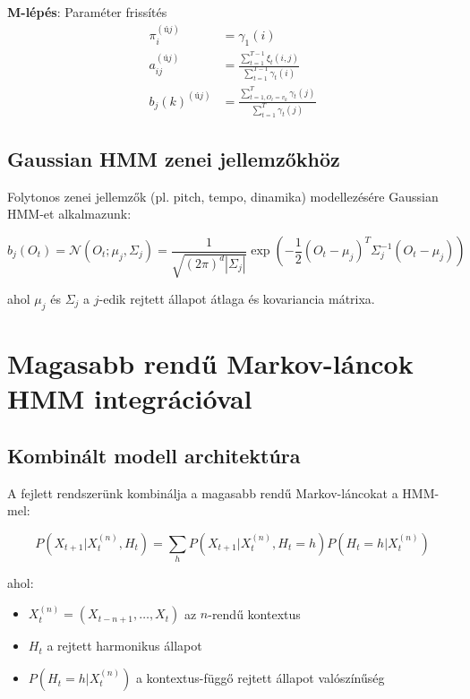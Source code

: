 \textbf{M-lépés}: Paraméter frissítés
\begin{align}
\pi_i^{(új)} &= \gamma_1(i) \\
a_{ij}^{(új)} &= \frac{\sum_{t=1}^{T-1} \xi_t(i,j)}{\sum_{t=1}^{T-1} \gamma_t(i)} \\
b_j(k)^{(új)} &= \frac{\sum_{t=1, O_t=v_k}^{T} \gamma_t(j)}{\sum_{t=1}^{T} \gamma_t(j)}
\end{align}

\subsection{Gaussian HMM zenei jellemzőkhöz}

Folytonos zenei jellemzők (pl. pitch, tempo, dinamika) modellezésére Gaussian HMM-et alkalmazunk:

\begin{equation}
b_j(O_t) = \mathcal{N}(O_t; \mu_j, \Sigma_j) = \frac{1}{\sqrt{(2\pi)^d |\Sigma_j|}} \exp\left(-\frac{1}{2}(O_t - \mu_j)^T \Sigma_j^{-1} (O_t - \mu_j)\right)
\end{equation}

ahol $\mu_j$ és $\Sigma_j$ a $j$-edik rejtett állapot átlaga és kovariancia mátrixa.

\section{Magasabb rendű Markov-láncok HMM integrációval}

\subsection{Kombinált modell architektúra}

A fejlett rendszerünk kombinálja a magasabb rendű Markov-láncokat a HMM-mel:

\begin{equation}
P(X_{t+1} | X_t^{(n)}, H_t) = \sum_{h} P(X_{t+1} | X_t^{(n)}, H_t = h) P(H_t = h | X_t^{(n)})
\end{equation}

ahol:
\begin{itemize}
    \item $X_t^{(n)} = (X_{t-n+1}, \ldots, X_t)$ az $n$-rendű kontextus
    \item $H_t$ a rejtett harmonikus állapot
    \item $P(H_t = h | X_t^{(n)})$ a kontextus-függő rejtett állapot valószínűség
\end{itemize}

